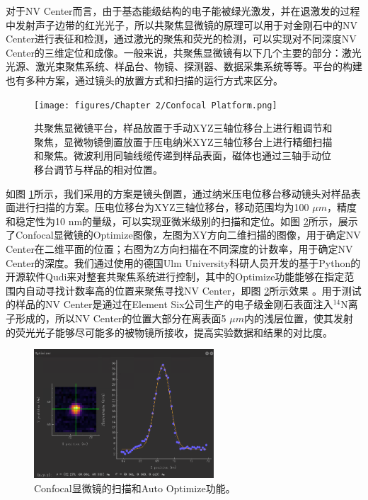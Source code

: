 \documentclass[type = bachelor, oneside]{whu-thesis}
\begin{document}
对于NV Center而言，由于基态能级结构的电子能被绿光激发，并在退激发的过程中发射声子边带的红光光子，所以共聚焦显微镜的原理可以用于对金刚石中的NV Center进行表征和检测，通过激光的聚焦和荧光的检测，可以实现对不同深度NV Center的三维定位和成像。一般来说，共聚焦显微镜有以下几个主要的部分：激光光源、激光束聚焦系统、样品台、物镜、探测器、数据采集系统等等。平台的构建也有多种方案，通过镜头的放置方式和扫描的运行方式来区分。
\begin{figure}
  \centering
  \texttt{[image: figures/Chapter 2/Confocal Platform.png]}
  \caption[共聚焦显微镜平台]{共聚焦显微镜平台，样品放置于手动XYZ三轴位移台上进行粗调节和聚焦，显微物镜倒置放置于压电纳米XYZ三轴位移台上进行精细扫描和聚焦。微波利用同轴线缆传递到样品表面，磁体也通过三轴手动位移台调节与样品的相对位置。}
  \label{fig: Confocal Platform}
\end{figure}
如图 \ref{fig: Confocal Platform}所示，我们采用的方案是镜头倒置，通过纳米压电位移台移动镜头对样品表面进行扫描的方案。压电位移台为XYZ三轴位移台，移动范围均为100 $\mu m$，精度和稳定性为10 nm的量级，可以实现亚微米级别的扫描和定位。如图 \ref{fig: Confocal Optimizer}所示，展示了Confocal显微镜的Optimize图像，左图为XY方向二维扫描的图像，用于确定NV Center在二维平面的位置；右图为Z方向扫描在不同深度的计数率，用于确定NV Center的深度。我们通过使用的德国Ulm University科研人员开发的基于Python的开源软件Qudi来对整套共聚焦系统进行控制，其中的Optimize功能能够在指定范围内自动寻找计数率高的位置来聚焦寻找NV Center，即图 \ref{fig: Confocal Optimizer}所示效果 \cite{Binder2017}。用于测试的样品的NV Center是通过在Element Six公司生产的电子级金刚石表面注入$^{14}$N离子形成的，所以NV Center的位置大部分在离表面5 $\mu m$内的浅层位置，使其发射的荧光光子能够尽可能多的被物镜所接收，提高实验数据和结果的对比度。
\begin{figure}
  \centering
  \includegraphics[width=0.6\textwidth]{figures/Chapter 2/Confocal Optimizer.png}
  \caption[Confocal显微镜的扫描和Auto Optimize功能]{Confocal显微镜的扫描和Auto Optimize功能。}
  \label{fig: Confocal Optimizer}
\end{figure}
\end{document}
